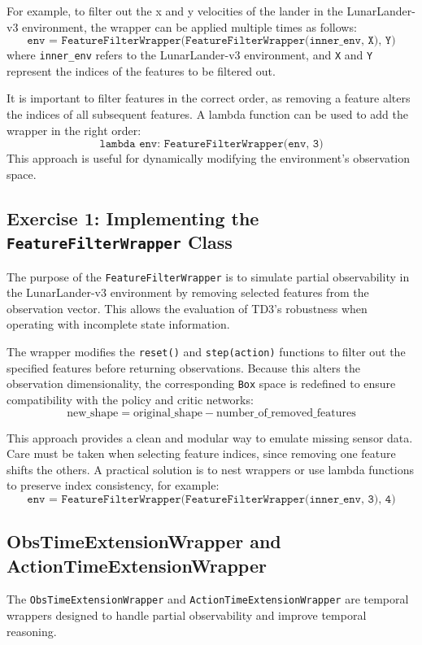 \documentclass[12pt, a4paper]{article}
\begin{document}
For example, to filter out the x and y velocities of the lander in the LunarLander-v3 environment, the wrapper can be applied multiple times as follows:
\[
\texttt{env = FeatureFilterWrapper(FeatureFilterWrapper(inner\_env, X), Y)}
\]
where \texttt{inner\_env} refers to the LunarLander-v3 environment, and \texttt{X} and \texttt{Y} represent the indices of the features to be filtered out.

It is important to filter features in the correct order, as removing a feature alters the indices of all subsequent features. A lambda function can be used to add the wrapper in the right order:
\[
\texttt{lambda env: FeatureFilterWrapper(env, 3)}
\]
This approach is useful for dynamically modifying the environment's observation space.

\subsection{Exercise 1: Implementing the \texttt{FeatureFilterWrapper} Class}


The purpose of the \texttt{FeatureFilterWrapper} is to simulate partial observability in the LunarLander-v3 environment by removing selected features from the observation vector. This allows the evaluation of TD3’s robustness when operating with incomplete state information.

The wrapper modifies the \texttt{reset()} and \texttt{step(action)} functions to filter out the specified features before returning observations. Because this alters the observation dimensionality, the corresponding \texttt{Box} space is redefined to ensure compatibility with the policy and critic networks:
\[
\text{new\_shape} = \text{original\_shape} - \text{number\_of\_removed\_features}
\]

This approach provides a clean and modular way to emulate missing sensor data. Care must be taken when selecting feature indices, since removing one feature shifts the others. A practical solution is to nest wrappers or use lambda functions to preserve index consistency, for example:
\[
\texttt{env = FeatureFilterWrapper(FeatureFilterWrapper(inner\_env, 3), 4)}
\]


\subsection{ObsTimeExtensionWrapper and ActionTimeExtensionWrapper}

The \texttt{ObsTimeExtensionWrapper} and \texttt{ActionTimeExtensionWrapper} are temporal wrappers designed to handle partial observability and improve temporal reasoning.
\end{document}
